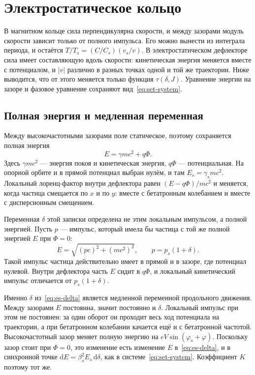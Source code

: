 \section{Электростатическое кольцо}
\label{sec:es}

В магнитном кольце сила перпендикулярна скорости, и между зазорами модуль скорости зависит только от полного импульса. Его можно вынести из интеграла периода, и остаётся $T/T_s=(C/C_s)(v_s/v)$. В электростатическом дефлекторе сила имеет составляющую вдоль скорости: кинетическая энергия меняется вместе с потенциалом, и $|v|$ различно в разных точках одной и той же траектории. Ниже выводится, что от этого меняется только функция $\tau(\delta,J)$. Уравнение энергии на зазоре и фазовое уравнение сохраняют вид~\eqref{eq:set-system}.

\subsection{Полная энергия и медленная переменная}
\label{sec:es-delta}

Между высокочастотными зазорами поле статическое, поэтому сохраняется полная энергия
\begin{equation}
\label{eq:es-energy}
E=\gamma mc^2+q\Phi.
\end{equation}
Здесь $\gamma mc^2$ --- энергия покоя и кинетическая энергия, $q\Phi$ --- потенциальная. На опорной орбите и в прямой потенциал выбран нулём, и там $E_s=\gamma_s mc^2$. Локальный лоренц-фактор внутри дефлектора равен $(E-q\Phi)/mc^2$ и меняется, когда частица смещается по $x$ и по $y$: вместе с бетатронным колебанием и вместе с дисперсионным смещением.

Переменная $\delta$ этой записки определена не этим локальным импульсом, а полной энергией. Пусть $p$ --- импульс, который имела бы частица с той же полной энергией $E$ при $\Phi=0$:
\begin{equation}
\label{eq:es-delta}
E=\sqrt{(pc)^2+(mc^2)^2},\qquad p=p_s(1+\delta).
\end{equation}
Такой импульс частица действительно имеет в прямой и в зазоре, где потенциал нулевой. Внутри дефлектора часть $E$ сидит в $q\Phi$, и локальный кинетический импульс отличается от $p_s(1+\delta)$.

Именно $\delta$ из~\eqref{eq:es-delta} является медленной переменной продольного движения. Между зазорами $E$ постоянна, значит постоянно и $\delta$. Локальный импульс при этом не постоянен: за один оборот он проходит весь ход потенциала на траектории, а при бетатронном колебании качается ещё и с бетатронной частотой. Высокочастотный зазор меняет полную энергию на $eV\sin(\varphi_s+\varphi)$. Поскольку зазор стоит при $\Phi=0$, это изменение есть изменение $E$ в~\eqref{eq:es-delta}, и в синхронной точке $\mathrm{d}E=\beta_s^2 E_s\,\mathrm{d}\delta$, как в системе~\eqref{eq:set-system}. Коэффициент $K$ поэтому тот же.

